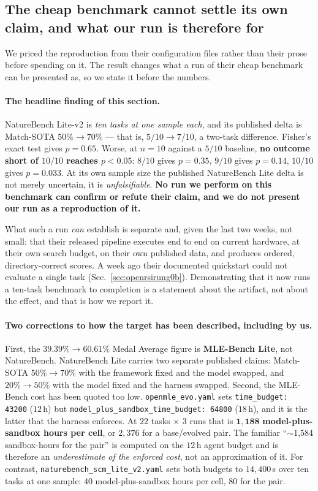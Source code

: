 \subsection{The cheap benchmark cannot settle its own claim, and what our run is therefore
for}
\label{sec:openrsicost}

We priced the reproduction from their configuration files rather than their prose before
spending on it. The result changes what a run of their cheap benchmark can be presented as,
so we state it before the numbers.

\paragraph{The headline finding of this section.}
NatureBench Lite-v2 is \emph{ten tasks at one sample each}, and its published delta is
Match-SOTA $50\% \to 70\%$ --- that is, $5/10 \to 7/10$, a two-task difference. Fisher's exact
test gives $p = 0.65$. Worse, at $n=10$ against a $5/10$ baseline, \textbf{no outcome short of
$10/10$ reaches $p<0.05$}: $8/10$ gives $p=0.35$, $9/10$ gives $p=0.14$, $10/10$ gives
$p=0.033$. At its own sample size the published NatureBench Lite delta is not merely
uncertain, it is \emph{unfalsifiable}. \textbf{No run we perform on this benchmark can
confirm or refute their claim, and we do not present our run as a reproduction of it.}

What such a run \emph{can} establish is separate and, given the last two weeks, not small:
that their released pipeline executes end to end on current hardware, at their own search
budget, on their own published data, and produces ordered, directory-correct scores. A week
ago their documented quickstart could not evaluate a single task
(Sec.~\ref{sec:openrsirung0b}). Demonstrating that it now runs a ten-task benchmark to
completion is a statement about the artifact, not about the effect, and that is how we
report it.

\paragraph{Two corrections to how the target has been described, including by us.}
First, the $39.39\% \to 60.61\%$ Medal Average figure is \textbf{MLE-Bench Lite}, not
NatureBench. NatureBench Lite carries two separate published claims: Match-SOTA
$50\% \to 70\%$ with the framework fixed and the model swapped, and $20\% \to 50\%$ with the
model fixed and the harness swapped. Second, the MLE-Bench cost has been quoted too low.
\texttt{openmle\_evo.yaml} sets \texttt{time\_budget: 43200} ($12$\,h) but
\texttt{model\_plus\_sandbox\_time\_budget: 64800} ($18$\,h), and it is the latter that the
harness enforces. At $22$ tasks $\times$ $3$ runs that is $\mathbf{1{,}188}$
\textbf{model-plus-sandbox hours per cell}, or $2{,}376$ for a base/evolved pair. The
familiar ``$\sim$1{,}584 sandbox-hours for the pair'' is computed on the $12$\,h agent budget
and is therefore an \emph{underestimate of the enforced cost}, not an approximation of it.
For contrast, \texttt{naturebench\_scm\_lite\_v2.yaml} sets both budgets to $14{,}400$\,s over
ten tasks at one sample: $40$ model-plus-sandbox hours per cell, $80$ for the pair.

